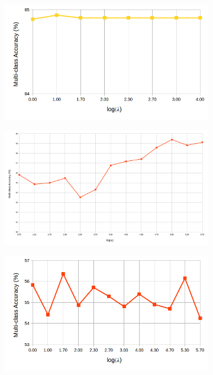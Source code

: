 \begin{figure}[!h]
\begin{subfigure}[b]{0.43\linewidth}
  \end{subfigure}
    \begin{subfigure}[b]{0.43\linewidth}
    \includegraphics[width=\linewidth]{images/jeac_lambda_awa}
  \end{subfigure}
    \begin{subfigure}[b]{0.43\linewidth}
    \includegraphics[width=\linewidth]{images/jeac_gamma_birds.png}
  \end{subfigure}
\begin{subfigure}[b]{0.43\linewidth}
    \includegraphics[width=\linewidth]{images/jeac_lambda_birds.png}

\end{subfigure}
\end{figure}
